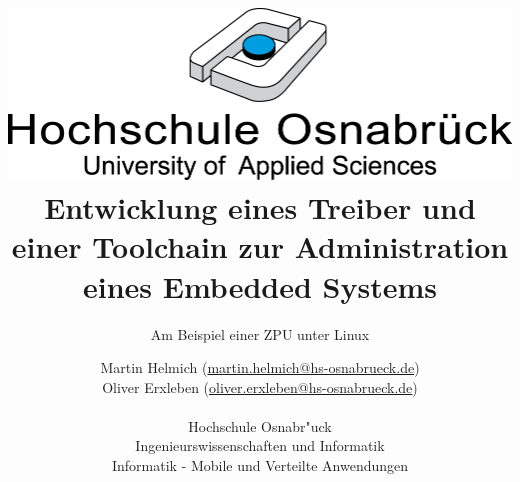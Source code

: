 \documentclass[11pt]{scrartcl}
\begin{document}
\author{%
	Martin Helmich \small(\href{mailto:martin.helmich@hs-osnabrueck.de}{martin.helmich@hs-osnabrueck.de})\\%
	Oliver Erxleben \small(\href{mailto:oliver.erxleben@hs-osnabrueck.de}{oliver.erxleben@hs-osnabrueck.de})\\ \\%
	Hochschule Osnabr"uck \\%
	Ingenieurswissenschaften und Informatik \\%
	Informatik - Mobile und Verteilte Anwendungen }

\title{\includegraphics[scale=0.75,keepaspectratio]{images/hs_os.png}\linebreak \linebreak Entwicklung eines Treiber und einer Toolchain zur Administration eines Embedded Systems}
\subtitle{Am Beispiel einer ZPU unter Linux}

\maketitle
\thispagestyle{empty}
\pagebreak
\tableofcontents
\thispagestyle{empty}
\listoffigures

\lstlistoflistings
\end{document}
